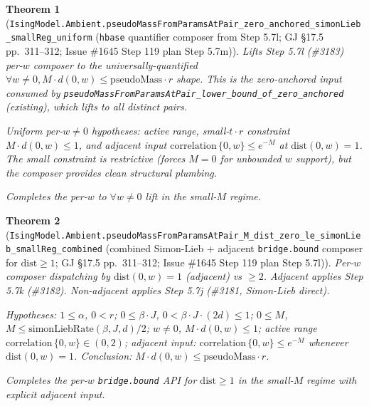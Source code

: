 \documentclass[a4paper,11pt]{article}
\newtheorem{theorem}{Theorem}
\begin{document}
\begin{theorem}[\texttt{IsingModel.Ambient.pseudoMassFromParamsAtPair\_zero\_anchored\_simonLieb\_smallReg\_uniform}
(\texttt{hbase} quantifier composer from Step 5.7l;
GJ \S17.5 pp.~311--312; Issue \#1645 Step 119 plan Step 5.7m)]
Lifts Step 5.7l (\#3183) per-$w$ composer to the universally-quantified
$\forall w \ne 0, M \cdot d(0, w) \le \mathrm{pseudoMass} \cdot r$ shape.
This is the zero-anchored input consumed by
\texttt{pseudoMassFromParamsAtPair\_lower\_bound\_of\_zero\_anchored}
(existing), which lifts to all distinct pairs.

Uniform per-$w \ne 0$ hypotheses: active range, small-$t\cdot r$
constraint $M \cdot d(0, w) \le 1$, and adjacent input
$\mathrm{correlation}\,\{0, w\} \le e^{-M}$ at $\mathrm{dist}(0, w) = 1$.
The small constraint is restrictive (forces $M = 0$ for unbounded $w$
support), but the composer provides clean structural plumbing.

Completes the per-$w$ to $\forall w \ne 0$ lift in the small-$M$ regime.
\end{theorem}

\begin{theorem}[\texttt{IsingModel.Ambient.pseudoMassFromParamsAtPair\_M\_dist\_zero\_le\_simonLieb\_smallReg\_combined}
(combined Simon-Lieb + adjacent \texttt{bridge.bound} composer for $\mathrm{dist} \ge 1$;
GJ \S17.5 pp.~311--312; Issue \#1645 Step 119 plan Step 5.7l)]
Per-$w$ composer dispatching by $\mathrm{dist}(0, w) = 1$ (adjacent) vs
$\ge 2$. Adjacent applies Step 5.7k (\#3182). Non-adjacent applies
Step 5.7j (\#3181, Simon-Lieb direct).

Hypotheses:
$1 \le \alpha$, $0 < r$;
$0 \le \beta\cdot J$, $0 < \beta\cdot J\cdot(2d) \le 1$;
$0 \le M$, $M \le \mathrm{simonLiebRate}(\beta, J, d)/2$;
$w \ne 0$, $M \cdot d(0, w) \le 1$;
active range $\mathrm{correlation}\,\{0, w\} \in (0, 2)$;
adjacent input: $\mathrm{correlation}\,\{0, w\} \le e^{-M}$ whenever
$\mathrm{dist}(0, w) = 1$.
Conclusion: $M \cdot d(0, w) \le \mathrm{pseudoMass} \cdot r$.

Completes the per-$w$ \texttt{bridge.bound} API for $\mathrm{dist} \ge 1$
in the small-$M$ regime with explicit adjacent input.
\end{theorem}
\end{document}
